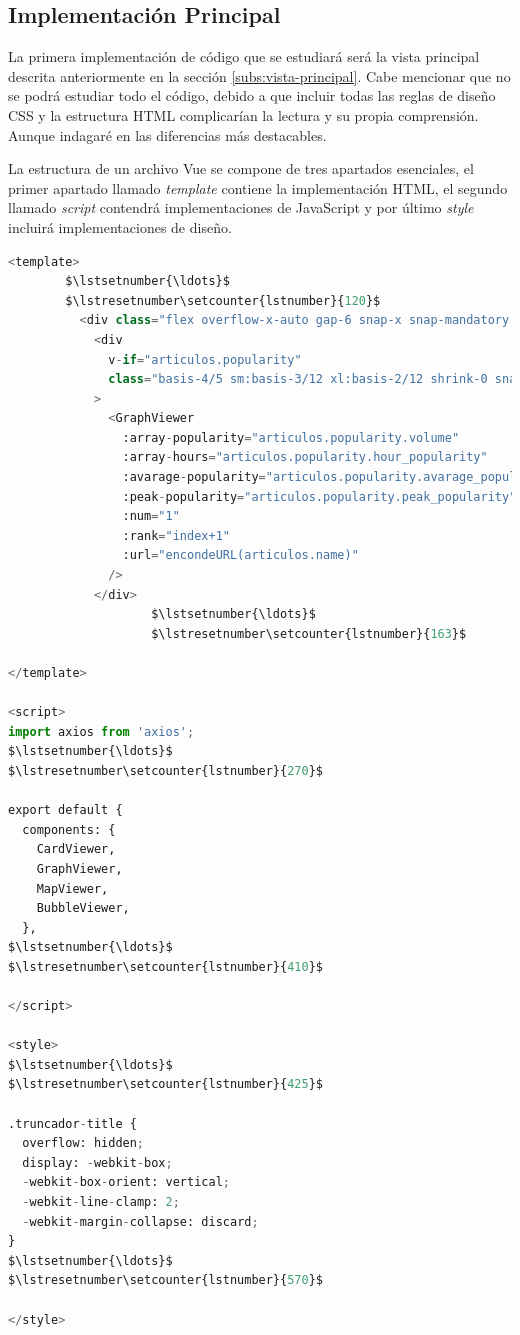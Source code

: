 \subsection{Implementación Principal}
La primera implementación de código que se estudiará será la vista principal descrita anteriormente en la sección \ref{subs:vista-principal}. Cabe mencionar que no se podrá estudiar todo el código, debido a que incluir todas las reglas de diseño CSS y la estructura HTML complicarían la lectura y su propia comprensión. Aunque indagaré en las diferencias más destacables.

\vspace{0.3cm}

La estructura de un archivo Vue se compone de tres apartados esenciales, el primer apartado llamado \textit{template} contiene la implementación HTML, el segundo llamado \textit{script} contendrá implementaciones de JavaScript y por último \textit{style} incluirá implementaciones de diseño.

\vspace{0.3cm}

\begin{lstlisting}[caption=Secciones de Vue,language=Python, mathescape=true]
<template>
        $\lstsetnumber{\ldots}$
        $\lstresetnumber\setcounter{lstnumber}{120}$
          <div class="flex overflow-x-auto gap-6 snap-x snap-mandatory sm:snap-normal before:shrink-0 before:w-[20%] sm:before:w-[0%] after:shrink-0 after:w-[20%] sm:after:w-[0%] sm:horizontal sm:pb-14 pb-5">
            <div
              v-if="articulos.popularity"
              class="basis-4/5 sm:basis-3/12 xl:basis-2/12 shrink-0 snap-center sm:snap-align-none shadowdrop"
            >
              <GraphViewer
                :array-popularity="articulos.popularity.volume"
                :array-hours="articulos.popularity.hour_popularity"
                :avarage-popularity="articulos.popularity.avarage_popularity"
                :peak-popularity="articulos.popularity.peak_popularity"
                :num="1"
                :rank="index+1"
                :url="encondeURL(articulos.name)"
              />
            </div>
                    $\lstsetnumber{\ldots}$
                    $\lstresetnumber\setcounter{lstnumber}{163}$

</template>

<script>
import axios from 'axios';
$\lstsetnumber{\ldots}$
$\lstresetnumber\setcounter{lstnumber}{270}$

export default {
  components: {
    CardViewer,
    GraphViewer,
    MapViewer,
    BubbleViewer,
  },
$\lstsetnumber{\ldots}$
$\lstresetnumber\setcounter{lstnumber}{410}$

</script>

<style>
$\lstsetnumber{\ldots}$
$\lstresetnumber\setcounter{lstnumber}{425}$

.truncador-title {
  overflow: hidden;
  display: -webkit-box;
  -webkit-box-orient: vertical;
  -webkit-line-clamp: 2;
  -webkit-margin-collapse: discard;
}
$\lstsetnumber{\ldots}$
$\lstresetnumber\setcounter{lstnumber}{570}$

</style>

\end{lstlisting}

